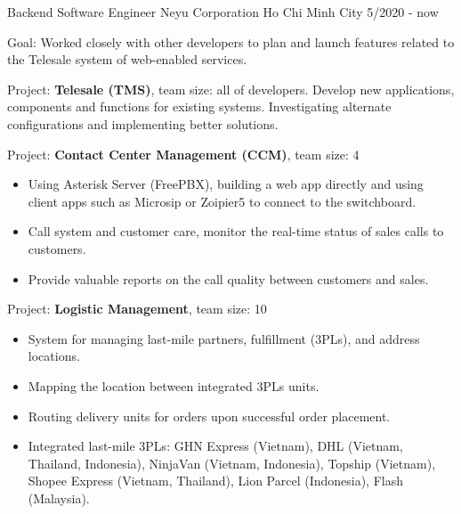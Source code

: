   \cventry
    {Backend Software Engineer} %
    {Neyu Corporation} %
    {Ho Chi Minh City} %
    {5/2020 - now} %
    {
      \begin{cvitems} %
        \item {Goal: Worked closely with other developers to plan and launch features related to the Telesale system of web-enabled services.}
        \item { Project: \textbf{Telesale (TMS)}, team size: all of developers. Develop new applications, components and functions for existing systems. Investigating alternate configurations and implementing better solutions. }
        \item { Project: \textbf{Contact Center Management (CCM)}, team size: 4 }
        {
            \begin{itemize}
                \item {Using Asterisk Server (FreePBX), building a web app directly and using client apps such as Microsip or Zoipier5 to connect to the switchboard.}
                \item { Call system and customer care, monitor the real-time status of sales calls to customers. }
                \item { Provide valuable reports on the call quality between customers and sales. }
            \end{itemize}
        }
        \item { Project: \textbf{Logistic Management}, team size: 10 }
        {
            \begin{itemize}
                \item { System for managing last-mile partners, fulfillment (3PLs), and address locations. }
                \item { Mapping the location between integrated 3PLs units. }
                \item { Routing delivery units for orders upon successful order placement. }
                \item { Integrated last-mile 3PLs: GHN Express (Vietnam), DHL (Vietnam, Thailand, Indonesia), NinjaVan (Vietnam, Indonesia), Topship (Vietnam), Shopee Express (Vietnam, Thailand), Lion Parcel (Indonesia), Flash (Malaysia). }

\end{itemize}}
\end{cvitems}}
